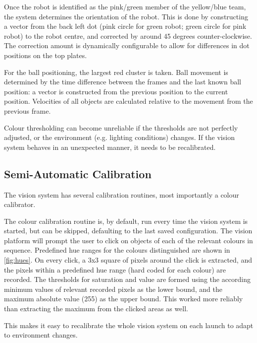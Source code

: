 Once the robot is identified as the pink/green member of the yellow/blue team, the system determines the orientation of the robot. This is done by constructing a vector from the back left dot (pink circle for green robot; green circle for pink robot) to the robot centre, and corrected by around 45 degrees counter-clockwise. The correction amount is dynamically configurable to allow for differences in dot positions on the top plates.

For the ball positioning, the largest red cluster is taken. Ball movement is determined by the time difference between the frames and the last known ball position: a vector is constructed from the previous position to the current position. Velocities of all objects are calculated relative to the movement from the previous frame. 

Colour thresholding can become unreliable if the thresholds are not perfectly adjusted, or the environment (e.g. lighting conditions) changes. If the vision system behaves in an unexpected manner, it needs to be recalibrated.


\subsection{Semi-Automatic Calibration}

The vision system has several calibration routines, most importantly a colour calibrator. 

The colour calibration routine is, by default, run every time the vision system is started, but can be skipped, defaulting to the last saved configuration. 
The vision platform will prompt the user to click on objects of each of the relevant colours in sequence. Predefined hue ranges for the colours distinguished are shown in \autoref{fig:hues}. On every click, a 3x3 square of pixels around the click is extracted, and the pixels within a predefined hue range (hard coded for each colour) are recorded.
The thresholds for saturation and value are formed using the according minimum values of relevant recorded pixels as the lower bound, and the maximum absolute value (255) as the upper bound.
This worked more reliably than extracting the maximum from the clicked areas as well.

This makes it easy to recalibrate the whole vision system on each launch to adapt to environment changes.

